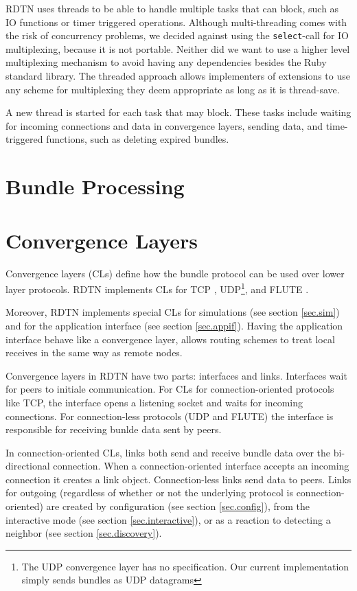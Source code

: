 \documentclass{article}
\begin{document}
RDTN uses threads to be able to handle multiple tasks that can block, such as IO
functions or timer triggered operations. Although multi-threading comes with the
risk of concurrency problems, we decided against using the {\tt select}-call for
IO multiplexing, because it is not portable. Neither did we want to use a higher
level multiplexing mechanism to avoid having any dependencies besides the Ruby
standard library. The threaded approach allows implementers of extensions to use
any scheme for multiplexing they deem appropriate as long as it is thread-save.

A new thread is started for each task that may block. These tasks include
waiting for incoming connections and data in convergence layers, sending data,
and time-triggered functions, such as deleting expired bundles.

\section{Bundle Processing}\label{sec.bundle-proc}

\section{Convergence Layers}\label{sec.cl}

Convergence layers (CLs) define how the bundle protocol can be used over lower
layer protocols. RDTN implements CLs for TCP \cite{tcp-cl}, UDP\footnote{The UDP
convergence layer has no specification. Our current implementation simply sends
bundles as UDP datagrams}, and FLUTE \cite{flute-cl}.

Moreover, RDTN implements special CLs for simulations (see section
\ref{sec.sim}) and for the application interface (see section \ref{sec.appif}).
Having the application interface behave like a convergence layer, allows routing
schemes to treat local receives in the same way as remote nodes.

Convergence layers in RDTN have two parts: interfaces and links. Interfaces wait
for peers to initiale communication. For CLs for connection-oriented protocols
like TCP, the interface opens a listening socket and waits for incoming
connections. For connection-less protocols (UDP and FLUTE) the interface is
responsible for receiving bunlde data sent by peers.

In connection-oriented CLs, links both send and receive bundle data over the
bi-directional connection. When a connection-oriented interface accepts an
incoming connection it creates a link object. Connection-less links send data to
peers. Links for outgoing (regardless of whether or not the underlying protocol
is connection-oriented) are created by configuration (see section
\ref{sec.config}), from the interactive mode (see section
\ref{sec.interactive}), or as a reaction to detecting a neighbor (see section
\ref{sec.discovery}).
\end{document}
